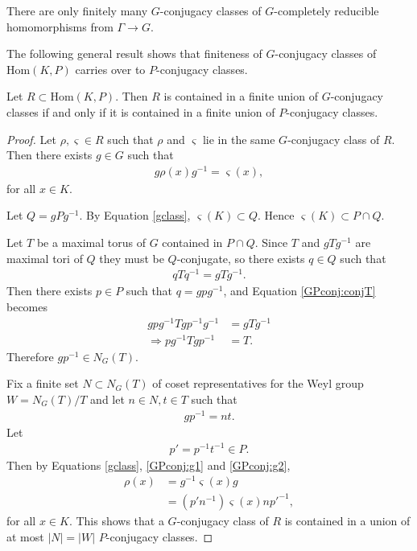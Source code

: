 \begin{theorem} \label{thm:finiteGCR} There are only finitely many $G$-conjugacy classes of $G$-completely reducible homomorphisms from $\Gamma\rightarrow G$.
\end{theorem}


The following general result shows that finiteness of $G$-conjugacy classes of $\mathrm{Hom}(K, P)$ carries over to $P$-conjugacy classes. 
\begin{lemma} Let $R \subset \mathrm{Hom}(K, P)$. Then $R$ is contained in a finite union of $G$-conjugacy classes if and only if it is contained in a finite union of $P$-conjugacy classes.
  \label{lem:GPconj}
\end{lemma}
\begin{proof}
	Let $\rho, \varsigma \in R$ such that $\rho$ and $\varsigma$ lie in the same $G$-conjugacy class of $R$. Then there exists $g\in G$ such that
	\begin{align} \label{gclass}
		g \rho(x) g^{-1} = \varsigma(x),
	\end{align}
for all $x \in K$.
	
	Let $Q = gPg^{-1}$. By Equation \ref{gclass}, $\varsigma(K) \subset Q$. Hence $\varsigma(K) \subset P \cap Q$.
	
	Let $T$ be a maximal torus of $G$ contained in $P\cap Q$. Since $T$ and $gTg^{-1}$ are maximal tori of $Q$ they must be $Q$-conjugate, so there exists $q\in Q$ such that
	\begin{align} \label{GPconj:conjT}
		qTq^{-1} = gTg^{-1}.
	\end{align}
	Then there exists $p\in P$ such that $q = gpg^{-1}$, and Equation \ref{GPconj:conjT} becomes
	\begin{align*}
		gpg^{-1}Tgp^{-1}g^{-1} &= gTg^{-1} \\
		\Rightarrow pg^{-1}Tgp^{-1} &= T.
	\end{align*}
	Therefore $gp^{-1} \in N_G(T)$. 

	Fix a finite set $N \subset N_G(T)$ of coset representatives for the Weyl group $W = N_G(T)/T$ and let $n \in N, t \in T$ such that
	\begin{align} \label{GPconj:g1}
		gp^{-1} = nt.
	\end{align}
	Let \begin{align} \label{GPconj:g2} p' = p^{-1}t^{-1} \in P. \end{align} Then by Equations \ref{gclass}, \ref{GPconj:g1} and \ref{GPconj:g2},
	\begin{align*}
		\rho(x) &= g^{-1} \varsigma(x) g\\
		&= (p'n^{-1}) \varsigma(x) np'^{-1},
	\end{align*}
	for all $x \in K$.
	This shows 
	that a $G$-conjugacy class of $R$ is contained in a union of at most $|N| = |W|$ $P$-conjugacy classes.


\end{proof}
